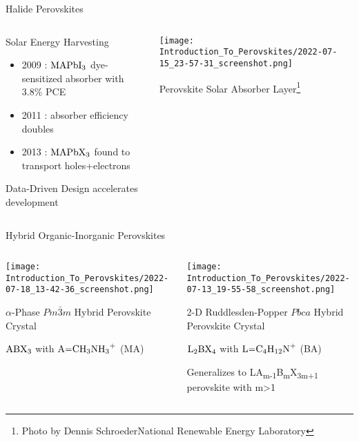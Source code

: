 \documentclass[10pt, aspectratio=169, presentation]{beamer}
\begin{document}
\begin{frame}[label={sec:org0c88d2a}]{Halide Perovskites}
\begin{columns}
\begin{column}{0.4\columnwidth}
\begin{block}{Solar Energy Harvesting}
\begin{itemize}
\item 2009 : \(\ce{MAPbI_3}\) dye-sensitized absorber with 3.8\% PCE
\autocite{kojima-2009-organ-halid}
\item 2011 : absorber efficiency doubles
\autocite{im-2011}
\item 2013 : \(\ce{MAPbX_3}\) found to transport holes+electrons
\autocite{saliba-2014-influen-therm}
\end{itemize}

\alert{Data-Driven Design} accelerates development
\end{block}
\end{column}
\begin{column}{0.6\columnwidth}
\begin{center}
\texttt{[image: Introduction\_To\_Perovskites/2022-07-15\_23-57-31\_screenshot.png]}
\end{center}
Perovskite Solar Absorber Layer\footnote{\tiny{}Photo by Dennis Schroeder\newline{}National Renewable Energy Laboratory}
\end{column}
\end{columns}
\end{frame}
\begin{frame}[allowframebreaks]{Hybrid Organic-Inorganic Perovskites}
\begin{columns}
\begin{column}{0.5\columnwidth}
\begin{center}
\texttt{[image: Introduction\_To\_Perovskites/2022-07-18\_13-42-36\_screenshot.png]}
\end{center}

\(\alpha\)-Phase \(Pm\bar{3}m\) Hybrid Perovskite Crystal
\autocite{yan-2016-defec-physic}

\(\ce{ABX3}\) with \(\ce{A=CH3NH3+}\) (MA)
\end{column}
\begin{column}{0.5\columnwidth}
\begin{center}
\texttt{[image: Introduction\_To\_Perovskites/2022-07-13\_19-55-58\_screenshot.png]}
\end{center}
2-D Ruddlesden-Popper \(Pbca\) Hybrid Perovskite Crystal
\autocite{hong-2021-layer-edge}

\(\ce{L_2BX_4}\) with \(\ce{L=C4H12N+}\) (BA)

Generalizes to LA\textsubscript{m-1}B\textsubscript{m}X\textsubscript{3m+1} perovskite with m>1
\end{column}
\end{columns}
\end{frame}
\end{document}
